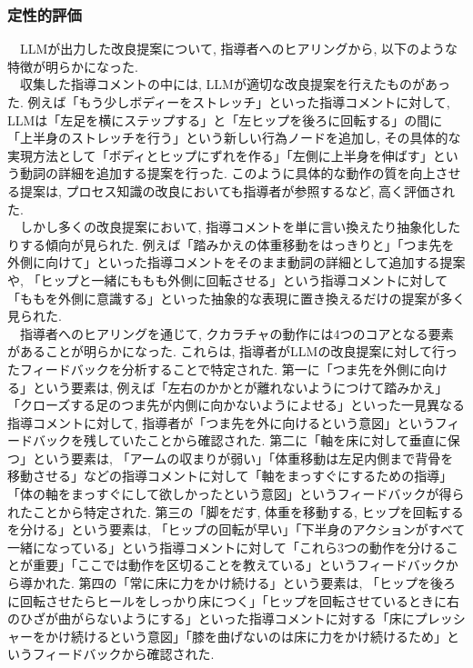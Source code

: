 \subsubsection{定性的評価}
　LLMが出力した改良提案について, 指導者へのヒアリングから, 以下のような特徴が明らかになった. \\
　収集した指導コメントの中には, LLMが適切な改良提案を行えたものがあった. 例えば「もう少しボディーをストレッチ」といった指導コメントに対して, LLMは「左足を横にステップする」と「左ヒップを後ろに回転する」の間に「上半身のストレッチを行う」という新しい行為ノードを追加し, その具体的な実現方法として「ボディとヒップにずれを作る」「左側に上半身を伸ばす」という動詞の詳細を追加する提案を行った. このように具体的な動作の質を向上させる提案は, プロセス知識の改良においても指導者が参照するなど, 高く評価された. \\
　しかし多くの改良提案において, 指導コメントを単に言い換えたり抽象化したりする傾向が見られた. 例えば「踏みかえの体重移動をはっきりと」「つま先を外側に向けて」といった指導コメントをそのまま動詞の詳細として追加する提案や, 「ヒップと一緒にももも外側に回転させる」という指導コメントに対して「ももを外側に意識する」といった抽象的な表現に置き換えるだけの提案が多く見られた. \\
　指導者へのヒアリングを通じて, クカラチャの動作には4つのコアとなる要素があることが明らかになった. これらは, 指導者がLLMの改良提案に対して行ったフィードバックを分析することで特定された. 第一に「つま先を外側に向ける」という要素は, 例えば「左右のかかとが離れないようにつけて踏みかえ」「クローズする足のつま先が内側に向かないようによせる」といった一見異なる指導コメントに対して, 指導者が「つま先を外に向けるという意図」というフィードバックを残していたことから確認された. 第二に「軸を床に対して垂直に保つ」という要素は, 「アームの収まりが弱い」「体重移動は左足内側まで背骨を移動させる」などの指導コメントに対して「軸をまっすぐにするための指導」「体の軸をまっすぐにして欲しかったという意図」というフィードバックが得られたことから特定された. 第三の「脚をだす, 体重を移動する, ヒップを回転するを分ける」という要素は, 「ヒップの回転が早い」「下半身のアクションがすべて一緒になっている」という指導コメントに対して「これら3つの動作を分けることが重要」「ここでは動作を区切ることを教えている」というフィードバックから導かれた. 第四の「常に床に力をかけ続ける」という要素は, 「ヒップを後ろに回転させたらヒールをしっかり床につく」「ヒップを回転させているときに右のひざが曲がらないようにする」といった指導コメントに対する「床にプレッシャーをかけ続けるという意図」「膝を曲げないのは床に力をかけ続けるため」というフィードバックから確認された. \\
